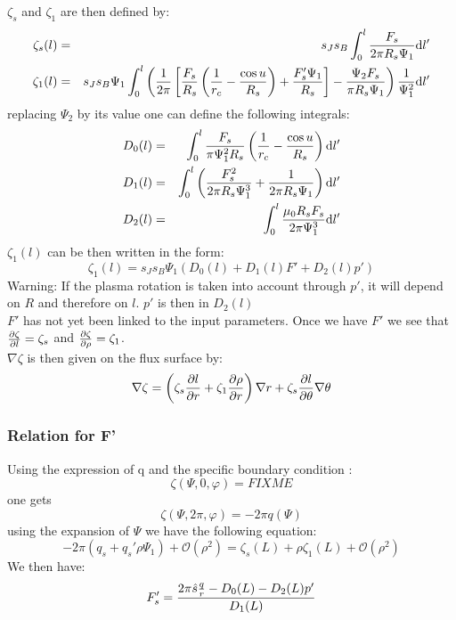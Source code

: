 $\zeta_s$ and $\zeta_1$ are then defined by:
\begin{eqnarray}
\zeta_s (l) &=& s_J s_B \int_0^l {{F_s \over 2 \pi R_s \Psi_1}\mathrm{d}l'} \\
\zeta_1 (l) &=& s_J s_B \Psi_1 \int_0^l {\left({1 \over 2 \pi} \left[{F_s \over R_s}\left({1 \over r_c} - {\cos u \over R_s} \right) + {F_s' \Psi_1 \over R_s} \right] - {\Psi_2 F_s \over \pi R_s \Psi_1} \right) {1 \over \Psi_1^2} \mathrm{d}l'}
\end{eqnarray}
replacing $\Psi_2$ by its value one can define the following integrals:
\begin{eqnarray}
D_0 (l) &=& \int_0^l {{F_s \over \pi \Psi_1^2 R_s} \left({1 \over r_c} - {\cos u \over R_s} \right) \mathrm{d}l'} \\
D_1 (l) &=& \int_0^l {\left({F_s^2 \over 2 \pi R_s \Psi_1^3} + {1 \over 2 \pi R_s \Psi_1}\right)\mathrm{d}l'} \\
D_2 (l) &=& \int_0^l {{\mu_0 R_s F_s \over 2 \pi \Psi_1^3} \mathrm{d}l'} 
\end{eqnarray}
$\zeta_1 (l)$ can be then written in the form:
\begin{equation}
\zeta_1 (l) = s_J s_B \Psi_1 \left(D_0(l) + D_1(l)F' + D_2(l)p' \right)
\end{equation}
Warning: If the plasma rotation is taken into account through $p'$, it will depend on $R$ and therefore on $l$. $p'$ is then in $D_2 (l)$ \\
$F'$ has not yet been linked to the input parameters. Once we have $F'$ we see that $\frac{\partial  \zeta}{\partial l} = \zeta_s$ and $\frac{\partial  \zeta}{\partial \rho} = \zeta_1$. \\
$\nabla \zeta$ is then given on the flux surface by:
\begin{equation}
\nabla \zeta = \left(\zeta_s \frac{\partial  l}{\partial r} + \zeta_1 \frac{\partial  \rho}{\partial r} \right) \nabla r + \zeta_s \frac{\partial  l}{\partial \theta} \nabla \theta
\end{equation}
\subsubsection{Relation for F'}
Using the expression of q and the specific boundary condition \cite{CAN09}: 
\begin{equation}
\zeta(\Psi,0,\varphi) = FIX ME
\end{equation}
one gets
\begin{equation}
\zeta(\Psi,2 \pi,\varphi) = -2\pi q(\Psi)
\end{equation}
using the expansion of $\Psi$ we have the following equation:
\begin{equation}
-2 \pi (q_s + q_s' \rho \Psi_1) + \mathcal{O}(\rho^2) = \zeta_s (L) + \rho \zeta_1 (L) + \mathcal{O}(\rho^2)  
\end{equation}
We then have:
\begin{equation}
F_s' = {2 \pi \hat{s}{q \over r} - D_0 (L) - D_2 (L) p' \over D_1(L)}
\end{equation}
